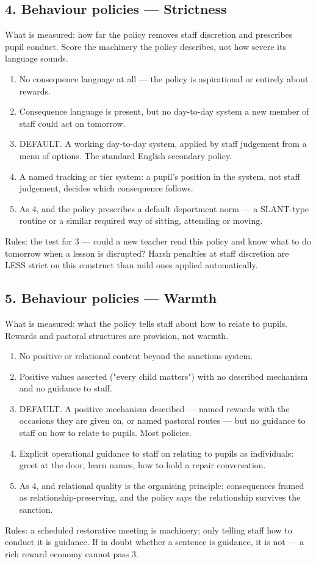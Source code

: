 \subsection*{4. Behaviour policies --- Strictness}
What is measured: how far the policy removes staff discretion and prescribes pupil conduct. Score the machinery the policy describes, not how severe its language sounds.

\begin{enumerate}
  \item No consequence language at all --- the policy is aspirational or entirely about rewards.
  \item Consequence language is present, but no day-to-day system a new member of staff could act on tomorrow.
  \item DEFAULT. A working day-to-day system, applied by staff judgement from a menu of options. The standard English secondary policy.
  \item A named tracking or tier system: a pupil's position in the system, not staff judgement, decides which consequence follows.
  \item As 4, and the policy prescribes a default deportment norm --- a SLANT-type routine or a similar required way of sitting, attending or moving.
\end{enumerate}
Rules: the test for 3 --- could a new teacher read this policy and know what to do tomorrow when a lesson is disrupted? Harsh penalties at staff discretion are LESS strict on this construct than mild ones applied automatically.

\subsection*{5. Behaviour policies --- Warmth}
What is measured: what the policy tells staff about how to relate to pupils. Rewards and pastoral structures are provision, not warmth.

\begin{enumerate}
  \item No positive or relational content beyond the sanctions system.
  \item Positive values asserted ("every child matters") with no described mechanism and no guidance to staff.
  \item DEFAULT. A positive mechanism described --- named rewards with the occasions they are given on, or named pastoral routes --- but no guidance to staff on how to relate to pupils. Most policies.
  \item Explicit operational guidance to staff on relating to pupils as individuals: greet at the door, learn names, how to hold a repair conversation.
  \item As 4, and relational quality is the organising principle: consequences framed as relationship-preserving, and the policy says the relationship survives the sanction.
\end{enumerate}
Rules: a scheduled restorative meeting is machinery; only telling staff how to conduct it is guidance. If in doubt whether a sentence is guidance, it is not --- a rich reward economy cannot pass 3.

